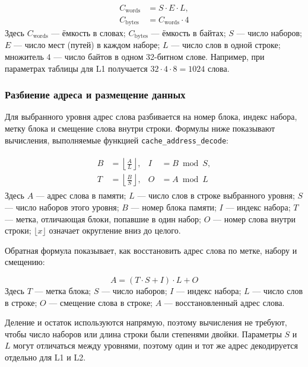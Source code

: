 \documentclass[12pt,a4paper]{article}
\begin{document}
\begin{equation}
    \boxed{\begin{aligned}
        C_{\text{words}} &= S \cdot E \cdot L,\\
        C_{\text{bytes}} &= C_{\text{words}} \cdot 4
    \end{aligned}}
\end{equation}
Здесь $C_{\text{words}}$ --- ёмкость в словах; $C_{\text{bytes}}$ --- ёмкость в байтах; $S$ --- число наборов; $E$ --- число мест (путей) в каждом наборе; $L$ --- число слов в одной строке; множитель $4$ --- число байтов в одном 32-битном слове. Например, при параметрах таблицы для L1 получается $32 \cdot 4 \cdot 8 = 1024$ слова.

\subsubsection{Разбиение адреса и размещение данных}

Для выбранного уровня адрес слова разбивается на номер блока, индекс набора, метку блока и смещение слова внутри строки. Формулы ниже показывают вычисления, выполняемые функцией \texttt{cache\_address\_decode}:

\begin{align}
    \boxed{\begin{aligned}
        B &= \left\lfloor \frac{A}{L} \right\rfloor, &
        I &= B \bmod S,\\
        T &= \left\lfloor \frac{B}{S} \right\rfloor, &
        O &= A \bmod L
    \end{aligned}}
\end{align}
Здесь $A$ --- адрес слова в памяти; $L$ --- число слов в строке выбранного уровня; $S$ --- число наборов этого уровня; $B$ --- номер блока памяти; $I$ --- индекс набора; $T$ --- метка, отличающая блоки, попавшие в один набор; $O$ --- номер слова внутри строки; $\lfloor x \rfloor$ означает округление вниз до целого.

Обратная формула показывает, как восстановить адрес слова по метке, набору и смещению:

\begin{equation}
    \boxed{A = (T \cdot S + I) \cdot L + O}
\end{equation}
Здесь $T$ --- метка блока; $S$ --- число наборов; $I$ --- индекс набора; $L$ --- число слов в строке; $O$ --- смещение слова в строке; $A$ --- восстановленный адрес слова.

Деление и остаток используются напрямую, поэтому вычисления не требуют, чтобы число наборов или длина строки были степенями двойки. Параметры $S$ и $L$ могут отличаться между уровнями, поэтому один и тот же адрес декодируется отдельно для L1 и L2.
\end{document}
